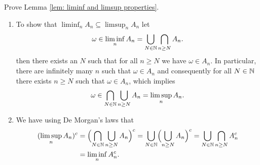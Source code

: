 \begin{exercise}
    \label{ex: liminf and limsup properties}
    Prove Lemma \ref{lem: liminf and limsup properties}. 

    \begin{solution}
        \begin{enumerate}[label=(\roman*)]
            \item To show that  \(\liminf_n A_n \subseteq \limsup_n A_n\) let
            \[
                \omega \in \liminf_n A_n = \bigcup_{N\in \mathbb{N}} \bigcap_{n\ge N} A_n.
            \]
            then there exists an \(N\) such that for all \(n \ge N\) we have
            \(\omega \in A_n\). In particular, there are infinitely many \(n\)
            such that \(\omega \in A_n\) and consequently for all \(N\in \mathbb{N}\) there
            exists \(n\ge N\) such that \(\omega \in A_n\), which implies
            \[
                \omega \in \bigcap_{N\in \mathbb{N}} \bigcup_{n\ge N} A_n = \limsup_n A_n.
            \]
            
            \item\label{it: de morgans on liminf/limsup} We have using De Morgan's laws that
            \[
            \begin{aligned}
                (\limsup_n A_n)^c
                &= \Bigl(\bigcap_{N\in \mathbb{N}} \bigcup_{n\ge N} A_n\Bigr)^c
                = \bigcup_{N\in \mathbb{N}} \Bigl(\bigcup_{n\ge N} A_n\Bigr)^c
                = \bigcup_{N\in\mathbb{N}} \bigcap_{n\ge N} A_n^c
                \\
                &= \liminf_n A_n^c.
            \end{aligned}
            \]


\end{enumerate}
\end{solution}
\end{exercise}
